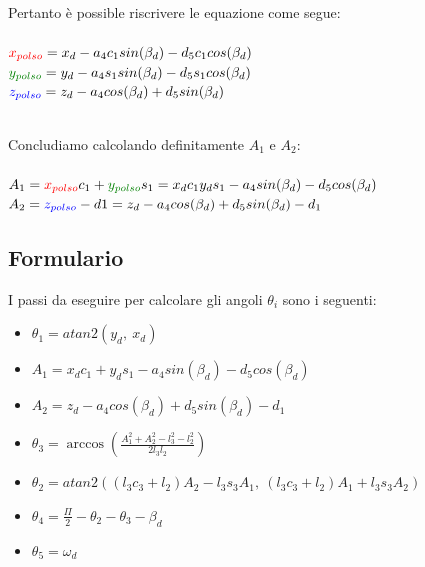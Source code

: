 \documentclass[a4paper]{article}
\begin{document}
    \begin{text}
        Pertanto è possible riscrivere le equazione come segue: \\ \\
        $\textcolor{red}{x_{polso}} = x_d - a_4 c_1 sin(\beta_d) - d_5 c_1 cos(\beta_d) $ \\
        $\textcolor[rgb]{0.004, 0.5, 0.004}{y_{polso}} = y_d - a_4 s_1 sin(\beta_d) - d_5 s_1 cos(\beta_d)$ \\
        $\textcolor{blue}{z_{polso}} = z_d - a_4 cos(\beta_d) + d_5 sin(\beta_d)$ \\ \\
    \end{text}
    
    \begin{text}
        Concludiamo calcolando definitamente $A_1$ e $A_2$: \\ \\
        $A_1 = \textcolor{red}{x_{polso}} c_1 + \textcolor[rgb]{0.004, 0.5, 0.004}{y_{polso}} s_1 = x_d c_1 y_d s_1 - a_4 sin(\beta_d) - d_5 cos(\beta_d)$ \\
        $A_2 = \textcolor{blue}{z_{polso}} - d1 = z_d - a_4 cos(\beta_d) + d_5 sin(\beta_d) -d_1$ \\
    \end{text}
    
    \subsection{Formulario}
    
    \begin{text}
        I passi da eseguire per calcolare gli angoli $\theta_i$ sono i seguenti: \\
    \end{text}
    
    \begin{itemize}
        \item $\theta_1 = atan2(y_d, \ x_d)$ \\
        
        \item $A_1 = x_d c_1 + y_d s_1 - a_4 sin(\beta_d) - d_5 cos(\beta_d)$
        \item $A_2 = z_d - a_4 cos(\beta_d) + d_5 sin(\beta_d) -d_1$ \\
        
        \item $\theta_3 = \arccos(\frac{A_1^2 + A_2^2 - l_3^2 - l_2^2}{2 l_3 l_2})$ \\
        
        \item $\theta_2 = atan2((l_3 c_3 + l_2) A_2 - l_3 s_3 A_1, \ (l_3 c_3 + l_2) A_1 + l_3 s_3 A_2)$ \\
        
        \item $\theta_4 = \frac{\Pi}{2}-\theta_2-\theta_3-\beta_d$ \\
        
        \item $\theta_5 = \omega_d$
    \end{itemize}
    
\end{document}
